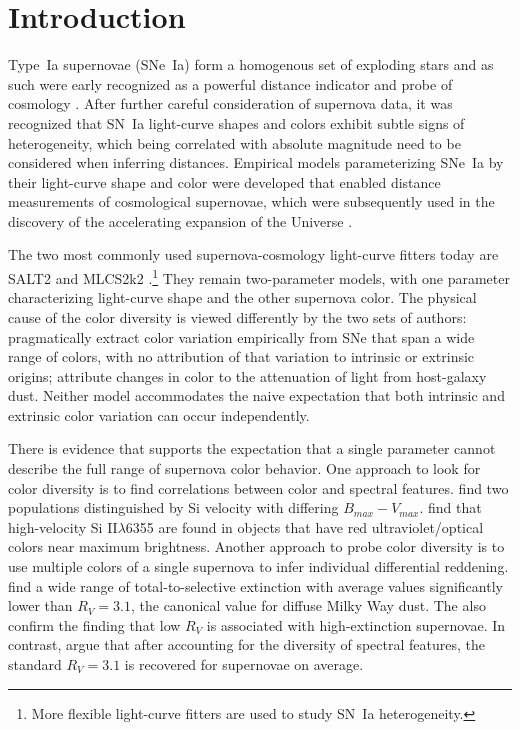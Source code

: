 \documentclass{aastex}   	%
\begin{document}
\section{Introduction}
Type~Ia supernovae (SNe~Ia) form a homogenous set of exploding stars and as such were early recognized as a powerful distance indicator 
and probe of cosmology \citep{1992ARA&A..30..359B}.  After further careful consideration of supernova data, it was recognized
that SN~Ia light-curve shapes \citep{1984SvA....28..658P, 1993ApJ...413L.105P} and colors \citep{1998A&A...331..815T} exhibit subtle signs of heterogeneity,
which being correlated with absolute magnitude
need to be considered when inferring distances.  Empirical models parameterizing SNe~Ia by their light-curve shape
and color were developed \citep{1996ApJ...473...88R, 1999ApJ...517..565P} that enabled distance measurements of cosmological supernovae,
which 
were subsequently used in the discovery of the accelerating expansion of the Universe \citep{1998AJ....116.1009R,1999ApJ...517..565P}.

The two most commonly used supernova-cosmology light-curve fitters today are SALT2 \citep{2007A&A...466...11G} and MLCS2k2
\citep{2007ApJ...659..122J}.\footnote{More flexible light-curve fitters
\citep[e.g.][]{2008ApJ...681..482C, 2011AJ....141...19B} are used to study SN~Ia heterogeneity.}
They remain two-parameter models, with one parameter characterizing light-curve shape and the other
supernova color.  The physical cause of the color diversity is viewed differently by the two sets of authors: 
\citet{2007A&A...466...11G} pragmatically extract color variation empirically from SNe that span a wide range of colors, with no attribution of
that variation to intrinsic or extrinsic origins;
\citet{2007ApJ...659..122J}
attribute changes in color to the attenuation of light from host-galaxy dust. Neither model accommodates the naive expectation that
both intrinsic and extrinsic color variation can occur independently.

There is evidence that supports the expectation that a single parameter cannot describe the full range
of supernova color behavior.  One approach to look for color diversity is to find correlations between color and spectral features.
\citet{2009ApJ...699L.139W, 2011ApJ...729...55F} find two populations distinguished
by Si velocity with differing $B_{max}-V_{max}$.
\citet{2015MNRAS.451.1973S}
find that high-velocity Si II$\lambda$6355 are found in objects that have red ultraviolet/optical colors near maximum brightness.
Another approach to probe color diversity is to use multiple colors of a single supernova to infer individual differential reddening. 
\citet{2014ApJ...789...32B, 2015MNRAS.453.3300A} find a wide
range of total-to-selective extinction with average values significantly lower than $R_V = 3.1$,
the canonical value for diffuse Milky Way dust.
The also confirm the \citet{2011ApJ...729...55F} finding that low $R_V$ is associated with high-extinction supernovae.
In contrast, \citet{2011A&A...529L...4C} argue that after accounting for the diversity of spectral features,
the standard $R_V=3.1$ is recovered for supernovae on average.
\end{document}
